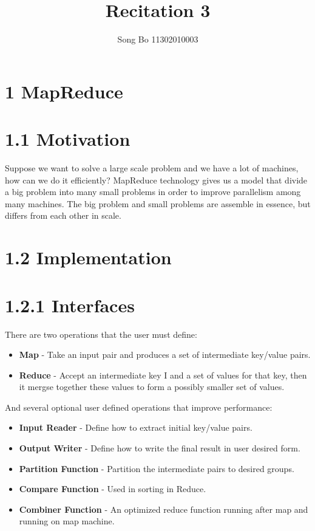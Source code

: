 \documentclass[a4paper]{article}
\title{Recitation 3}
\author{Song Bo 11302010003}
\begin{document}
 
  \maketitle 
 \section*{1 MapReduce}
 \section*{1.1 Motivation}
 Suppose we want to solve a large scale problem and we have a lot of machines, how can we do it efficiently? MapReduce technology gives us a model that divide a big problem into many small problems in order to improve parallelism among many machines. The big problem and small problems are assemble in essence, but differs from each other in  scale.
 \section*{1.2 Implementation}
 \section*{1.2.1 Interfaces}
 There are two operations that the user must define:
 \begin{itemize}
 \item \textbf{Map} - Take an input pair and produces a set of intermediate key/value pairs.
 \item \textbf{Reduce} - Accept an intermediate key I and a set of values for that key, then it mergse together these values to form a possibly smaller set of values.
 \end{itemize}
 And several optional user defined operations that improve performance:
 \begin{itemize}
 \item \textbf{Input Reader} - Define how to extract initial key/value pairs.
 \item \textbf{Output Writer} - Define how to write the final result in user desired form.
 \item \textbf{Partition Function} - Partition the intermediate pairs to desired groups.
 \item \textbf{Compare Function} - Used in sorting in Reduce.
 \item \textbf{Combiner Function} - An optimized reduce function running after map and running on map machine.
 \end{itemize}
\end{document}
